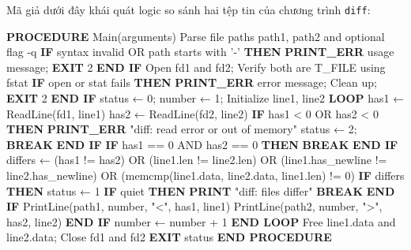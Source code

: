 \documentclass[12pt,a4paper]{article}
\newenvironment{algorithmblock}[1]{%
  \begin{tcolorbox}[
    enhanced,
    breakable,
    colback=white,
    colframe=primary!55,
    colbacktitle=primary,
    coltitle=white,
    boxrule=0.7pt,
    arc=2pt,
    left=10pt,right=10pt,top=7pt,bottom=8pt,
    title={#1},
    fonttitle=\small
  ]
}{%
  \end{tcolorbox}
}
\begin{document}
Mã giả dưới đây khái quát logic so sánh hai tệp tin của chương trình \texttt{diff}:

\begin{algorithmblock}{\texttt{diff}}
\begin{algorithmcode}
\textbf{PROCEDURE} Main(arguments)
    Parse file paths path1, path2 and optional flag -q
    \textbf{IF} syntax invalid OR path starts with '-' \textbf{THEN}
        \textbf{PRINT\_ERR} usage message; \textbf{EXIT} 2
    \textbf{END IF}
    Open fd1 and fd2; Verify both are T_FILE using fstat
    \textbf{IF} open or stat fails \textbf{THEN}
        \textbf{PRINT\_ERR} error message; Clean up; \textbf{EXIT} 2
    \textbf{END IF}
    status ← 0; number ← 1; Initialize line1, line2
    \textbf{LOOP}
        has1 ← ReadLine(fd1, line1)
        has2 ← ReadLine(fd2, line2)
        \textbf{IF} has1 < 0 OR has2 < 0 \textbf{THEN}
            \textbf{PRINT\_ERR} "diff: read error or out of memory"
            status ← 2; \textbf{BREAK}
        \textbf{END IF}
        \textbf{IF} has1 == 0 AND has2 == 0 \textbf{THEN}
            \textbf{BREAK}
        \textbf{END IF}
        differs ← (has1 != has2) OR (line1.len != line2.len) OR
                  (line1.has_newline != line2.has_newline) OR
                  (memcmp(line1.data, line2.data, line1.len) != 0)
        \textbf{IF} differs \textbf{THEN}
            status ← 1
            \textbf{IF} quiet \textbf{THEN}
                \textbf{PRINT} "diff: files differ"
                \textbf{BREAK}
            \textbf{END IF}
            PrintLine(path1, number, "<", has1, line1)
            PrintLine(path2, number, ">", has2, line2)
        \textbf{END IF}
        number ← number + 1
    \textbf{END LOOP}
    Free line1.data and line2.data; Close fd1 and fd2
    \textbf{EXIT} status
\textbf{END PROCEDURE}
\end{algorithmcode}
\end{algorithmblock}
\end{document}

